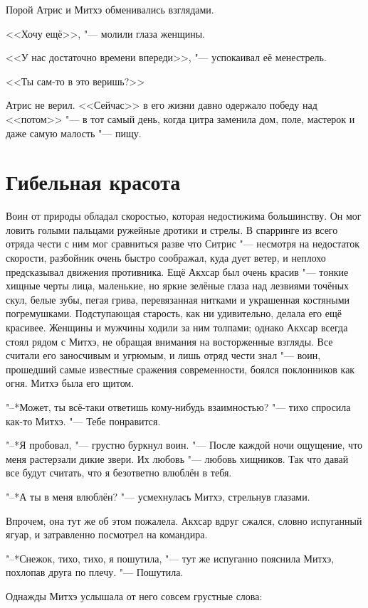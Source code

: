 \documentclass[a4paper,10pt,fleqn]{book}
\begin{document}
Порой Атрис и Митхэ обменивались взглядами.

<<Хочу ещё>>, "--- молили глаза женщины.

<<У нас достаточно времени впереди>>, "--- успокаивал её менестрель.

<<Ты сам-то в это веришь?>>

Атрис не верил.
<<Сейчас>> в его жизни давно одержало победу над <<потом>> "--- в тот самый день, когда цитра заменила дом, поле, мастерок и даже самую малость "--- пищу.

\section{Гибельная красота}

Воин от природы обладал скоростью, которая недостижима большинству.
Он мог ловить голыми пальцами ружейные дротики и стрелы.
В спарринге из всего отряда чести с ним мог сравниться разве что Ситрис "--- несмотря на недостаток скорости, разбойник очень быстро соображал, куда дует ветер, и неплохо предсказывал движения противника.
Ещё Акхсар был очень красив "--- тонкие хищные черты лица, маленькие, но яркие зелёные глаза над лезвиями точёных скул, белые зубы, пегая грива, перевязанная нитками и украшенная костяными погремушками.
Подступающая старость, как ни удивительно, делала его ещё красивее.
Женщины и мужчины ходили за ним толпами;
однако Акхсар всегда стоял рядом с Митхэ, не обращая внимания на восторженные взгляды.
Все считали его заносчивым и угрюмым, и лишь отряд чести знал "--- воин, прошедший самые известные сражения современности, боялся поклонников как огня.
Митхэ была его щитом.

"--*Может, ты всё-таки ответишь кому-нибудь взаимностью? "--- тихо спросила как-то Митхэ.
"--- Тебе понравится.

"--*Я пробовал, "--- грустно буркнул воин.
"--- После каждой ночи ощущение, что меня растерзали дикие звери.
Их любовь "--- любовь хищников.
Так что давай все будут считать, что я безответно влюблён в тебя.

"--*А ты в меня влюблён? "--- усмехнулась Митхэ, стрельнув глазами.

Впрочем, она тут же об этом пожалела.
Акхсар вдруг сжался, словно испуганный ягуар, и затравленно посмотрел на командира.

"--*Снежок, тихо, тихо, я пошутила, "--- тут же испуганно пояснила Митхэ, похлопав друга по плечу.
"--- Пошутила.

Однажды Митхэ услышала от него совсем грустные слова:
\end{document}
